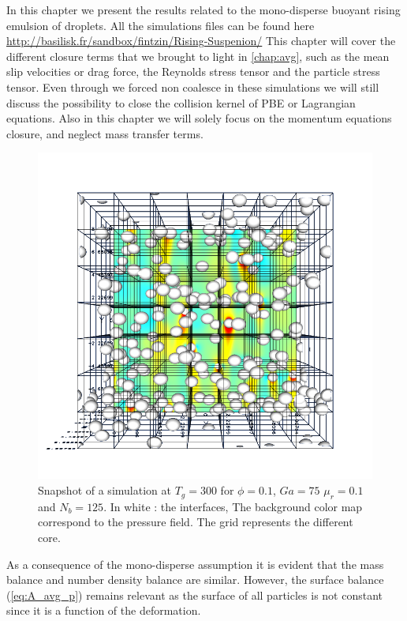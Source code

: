 
In this chapter we present the results related to the mono-disperse buoyant rising  emulsion of droplets.
All the simulations files can be found here \url{http://basilisk.fr/sandbox/fintzin/Rising-Suspenion/}
This chapter will cover the different closure terms that we brought to light in \ref{chap:avg}, such as the mean slip velocities or drag force, the Reynolds stress tensor and the particle stress tensor.
Even through we forced non coalesce in these simulations we will still discuss the possibility to close the collision kernel of PBE or Lagrangian equations. 
Also in this chapter we will solely focus on the momentum equations closure, and neglect mass transfer terms. 
\begin{figure}
    \centering
    \includegraphics[width = 0.8 \textwidth]{image/PHI_01_Ga_75.png}
    \caption{Snapshot of a simulation at $T_g = 300$ for $\phi = 0.1$, $Ga = 75$ $\mu_r = 0.1$ and $N_b = 125$. In white : the interfaces, The background color map correspond to the pressure field. The grid represents the different core.}
    \label{fig:pic_sim}
\end{figure}
As a consequence of the mono-disperse assumption it is evident that the mass balance and number density balance are similar. 
However, the surface balance (\ref{eq:A_avg_p}) remains relevant as the surface of all particles is not constant since it is a function of the deformation. 
